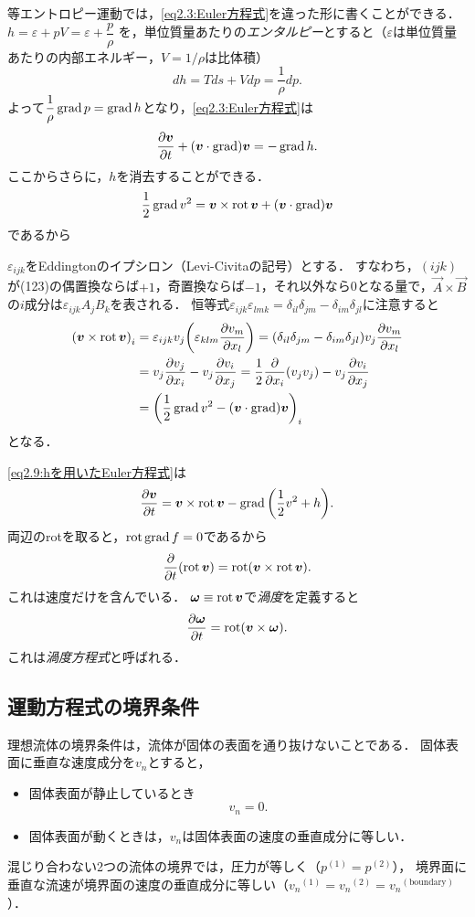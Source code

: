 等エントロピー運動では，\eqref{eq2.3:Euler方程式}を違った形に書くことができる．
$h = \varepsilon + pV = \varepsilon + \dfrac{p}{\rho}$
を，単位質量あたりの\emph{エンタルピー}とすると（$\varepsilon$は単位質量あたりの内部エネルギー，$V=1/\rho$は比体積）
\[
    dh = Tds + Vdp = \frac{1}{\rho} dp .
\]
よって$\dfrac{1}{\rho}\operatorname{grad} p = \operatorname{grad} h$となり，\eqref{eq2.3:Euler方程式}は
\begin{equation}\label{eq2.9:hを用いたEuler方程式}
    \pdv{\vb*{v}}{t} + (\vb*{v}\cdot\operatorname{grad})\vb*{v} = -\operatorname{grad} h .
\end{equation}
ここからさらに，$h$を消去することができる．
\[
    \frac{1}{2} \operatorname{grad} v^2 = \vb*{v} \times \operatorname{rot} \vb*{v} + (\vb*{v}\cdot\operatorname{grad})\vb*{v}
\]
であるから
\begin{details}
\nazenara
$\varepsilon_{ijk}$をEddingtonのイプシロン（Levi-Civitaの記号）とする．
すなわち，$(ijk)$が(123)の偶置換ならば$+1$，奇置換ならば$-1$，それ以外なら0となる量で，$\vec{A}\times\vec{B}$の$i$成分は$\varepsilon_{ijk}A_jB_k$を表される．
恒等式$\varepsilon_{ijk}\varepsilon_{lmk} = \delta_{il}\delta_{jm}-\delta_{im}\delta_{jl}$に注意すると
\begin{align*}
    \pqty{\v \times \Rot \v}_i &= \varepsilon_{ijk}v_j \pqty{\varepsilon_{klm}\pdv{v_m}{x_l}} = (\delta_{il}\delta_{jm}-\delta_{im}\delta_{jl}) v_j \pdv{v_m}{x_l} \\
    &= v_j \pdv{v_j}{x_i} - v_j \pdv{v_i}{x_j} = \frac{1}{2}\pdv{x_i}(v_jv_j) - v_j \pdv{v_i}{x_j} \\
    &= \pqty{ \frac{1}{2} \Grad v^2 - (\v\cdot\Grad)\v }_i
\end{align*}
となる．
\end{details}
%
\noindent
\eqref{eq2.9:hを用いたEuler方程式}は
\begin{equation}\label{eq2.10:rotとhを用いたEuler方程式}
    \pdv{\v}{t} = \v \times \Rot \v - \Grad\pqty{\frac{1}{2}v^2+h} .
\end{equation}
両辺のrotを取ると，$\operatorname{rot}\operatorname{grad} f=0$であるから
\begin{equation}\label{eq2.11:理想流体の渦度方程式}
    \pdv{t}(\operatorname{rot}\vb*{v}) = \operatorname{rot}(\vb*{v} \times \operatorname{rot} \vb*{v}) .
\end{equation}
これは速度だけを含んでいる．
$\vb*{\omega}\equiv\operatorname{rot}\vb*{v}$で\emph{渦度}を定義すると
\[
    \pdv{\vb*{\omega}}{t} = \operatorname{rot}(\vb*{v} \times \vb*{\omega}) .
\]
これは\emph{渦度方程式}と呼ばれる．


\subsection*{運動方程式の境界条件}
理想流体の境界条件は，流体が固体の表面を通り抜けないことである．
固体表面に垂直な速度成分を$v_n$とすると，
\begin{itemize}
    \item 固体表面が静止しているとき
    \begin{equation} v_n = 0 . \end{equation}    
    \item 固体表面が動くときは，$v_n$は固体表面の速度の垂直成分に等しい．
\end{itemize}
混じり合わない2つの流体の境界では，圧力が等しく（$p^{(1)}=p^{(2)}$），
境界面に垂直な流速が境界面の速度の垂直成分に等しい（${v_n}^{(1)}={v_n}^{(2)}={v_n}^{(\textrm{boundary})}$）．

